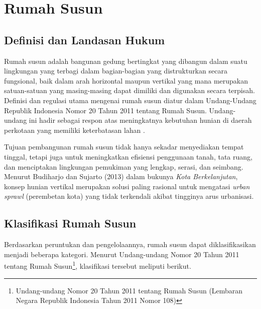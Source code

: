 \section{Rumah Susun}\label{sec:rumah_susun}

\subsection{Definisi dan Landasan Hukum}
Rumah susun adalah bangunan gedung bertingkat yang dibangun dalam suatu lingkungan yang terbagi dalam bagian-bagian yang distrukturkan secara fungsional, baik dalam arah horizontal maupun vertikal yang mana merupakan satuan-satuan yang masing-masing dapat dimiliki dan digunakan secara terpisah. Definisi dan regulasi utama mengenai rumah susun diatur dalam Undang-Undang Republik Indonesia Nomor 20 Tahun 2011 tentang Rumah Susun. Undang-undang ini hadir sebagai respon atas meningkatnya kebutuhan hunian di daerah perkotaan yang memiliki keterbatasan lahan \cite{sutedi2010hukum}.

Tujuan pembangunan rumah susun tidak hanya sekadar menyediakan tempat tinggal, tetapi juga untuk meningkatkan efisiensi penggunaan tanah, tata ruang, dan menciptakan lingkungan pemukiman yang lengkap, serasi, dan seimbang. Menurut Budiharjo dan Sujarto (2013) dalam bukunya \textit{Kota Berkelanjutan}, konsep hunian vertikal merupakan solusi paling rasional untuk mengatasi \textit{urban sprawl} (perembetan kota) yang tidak terkendali akibat tingginya arus urbanisasi.

\subsection{Klasifikasi Rumah Susun}
Berdasarkan peruntukan dan pengelolaannya, rumah susun dapat diklasifikasikan menjadi beberapa kategori. Menurut Undang-undang Nomor 20 Tahun 2011 tentang Rumah Susun\footnote{Undang-undang Nomor 20 Tahun 2011 tentang Rumah Susun (Lembaran Negara Republik Indonesia Tahun 2011 Nomor 108)}, klasifikasi tersebut meliputi berikut.

